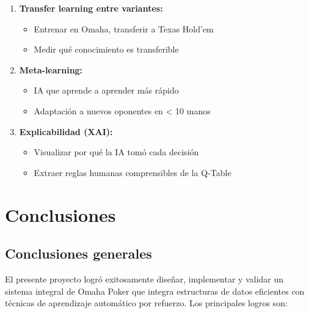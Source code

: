 \documentclass[12pt,a4paper]{article}
\begin{document}
\begin{enumerate}
    \item \textbf{Transfer learning entre variantes:}
    \begin{itemize}
        \item Entrenar en Omaha, transferir a Texas Hold'em
        \item Medir qué conocimiento es transferible
    \end{itemize}
    
    \item \textbf{Meta-learning:}
    \begin{itemize}
        \item IA que aprende a aprender más rápido
        \item Adaptación a nuevos oponentes en < 10 manos
    \end{itemize}
    
    \item \textbf{Explicabilidad (XAI):}
    \begin{itemize}
        \item Visualizar por qué la IA tomó cada decisión
        \item Extraer reglas humanas comprensibles de la Q-Table
    \end{itemize}
\end{enumerate}

\newpage

\section{Conclusiones}

\subsection{Conclusiones generales}

El presente proyecto logró exitosamente diseñar, implementar y validar un sistema integral de Omaha Poker que integra estructuras de datos eficientes con técnicas de aprendizaje automático por refuerzo. Los principales logros son:
\end{document}
